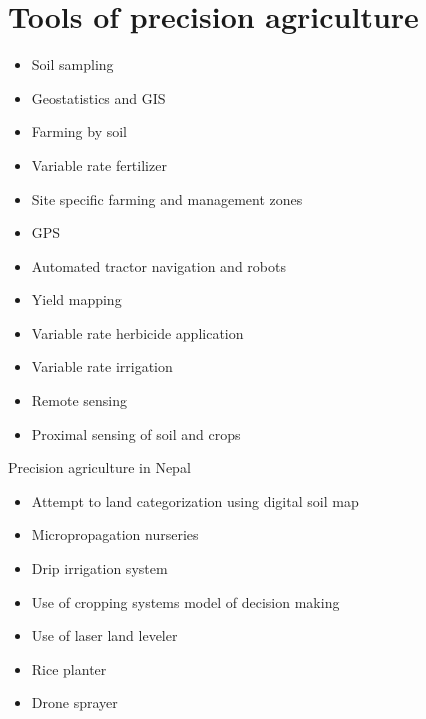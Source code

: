\documentclass[11pt,dvipsnames,ignorenonframetext,aspectratio=169]{beamer}
\providecommand{\tightlist}{%
  \setlength{\itemsep}{0pt}\setlength{\parskip}{0pt}}
\begin{document}
\hypertarget{tools-of-precision-agriculture}{%
\section{Tools of precision
agriculture}\label{tools-of-precision-agriculture}}

\begin{frame}{}
\protect\hypertarget{section-3}{}
\begin{itemize}
\tightlist
\item
  Soil sampling
\item
  Geostatistics and GIS
\item
  Farming by soil
\item
  Variable rate fertilizer
\item
  Site specific farming and management zones
\item
  GPS
\item
  Automated tractor navigation and robots
\item
  Yield mapping
\item
  Variable rate herbicide application
\item
  Variable rate irrigation
\item
  Remote sensing
\item
  Proximal sensing of soil and crops
\end{itemize}
\end{frame}

\begin{frame}{Precision agriculture in Nepal}
\protect\hypertarget{precision-agriculture-in-nepal}{}
\begin{itemize}
\tightlist
\item
  Attempt to land categorization using digital soil map
\item
  Micropropagation nurseries
\item
  Drip irrigation system
\item
  Use of cropping systems model of decision making
\item
  Use of laser land leveler
\item
  Rice planter
\item
  Drone sprayer
\end{itemize}
\end{frame}
\end{document}
